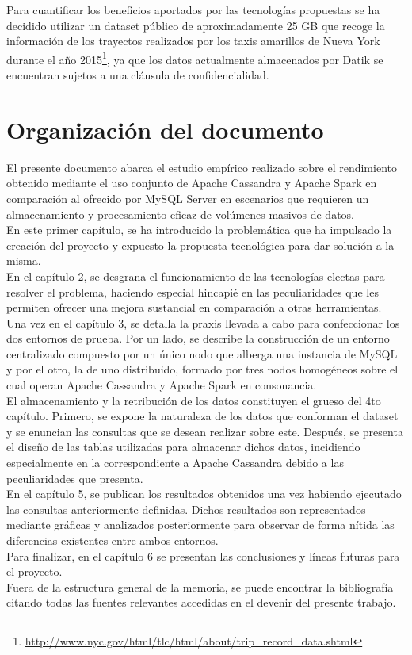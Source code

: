 Para cuantificar los beneficios aportados por las tecnologías propuestas se ha decidido utilizar un dataset público de aproximadamente 25 GB que recoge la información de los trayectos realizados por los taxis amarillos de Nueva York durante el año 2015\footnote{\url{http://www.nyc.gov/html/tlc/html/about/trip_record_data.shtml}}, ya que los datos actualmente almacenados por Datik se encuentran sujetos a una cláusula de confidencialidad.

\section{Organización del documento}

El presente documento abarca el estudio empírico realizado sobre el rendimiento obtenido mediante el uso conjunto de Apache Cassandra y Apache Spark en comparación al ofrecido por MySQL Server en escenarios que requieren un almacenamiento y procesamiento eficaz de volúmenes masivos de datos.\\

En este primer capítulo, se ha introducido la problemática que ha impulsado la creación del proyecto y expuesto la propuesta tecnológica para dar solución a la misma.\\

En el capítulo 2, se desgrana el funcionamiento de las tecnologías electas para resolver el problema, haciendo especial hincapié en las peculiaridades que les permiten ofrecer una mejora sustancial en comparación a otras herramientas.\\

Una vez en el capítulo 3, se detalla la praxis llevada a cabo para confeccionar los dos entornos de prueba. Por un lado, se describe la construcción de un entorno centralizado compuesto por un único nodo que alberga una instancia de MySQL y por el otro, la de uno distribuido, formado por tres nodos homogéneos sobre el cual operan Apache Cassandra y Apache Spark en consonancia.\\ 

El almacenamiento y la retribución de los datos constituyen el grueso del 4to capítulo. Primero, se expone la naturaleza de los datos que conforman el dataset y se enuncian las consultas que se desean realizar sobre este. Después, se presenta el diseño de las tablas utilizadas para almacenar dichos datos, incidiendo especialmente en la correspondiente a Apache Cassandra debido a las peculiaridades que presenta.\\ 

En el capítulo 5, se publican los resultados obtenidos una vez habiendo ejecutado las consultas anteriormente definidas. Dichos resultados son representados mediante gráficas y analizados posteriormente para observar de forma nítida las diferencias existentes entre ambos entornos.\\

Para finalizar, en el capítulo 6 se presentan las conclusiones y líneas futuras para el proyecto.\\

Fuera de la estructura general de la memoria, se puede encontrar la bibliografía citando todas las fuentes relevantes accedidas en el devenir del presente trabajo.